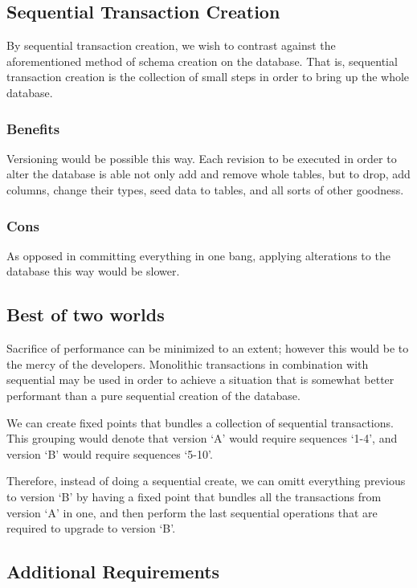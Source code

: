 \subsection{Sequential Transaction Creation}

By sequential transaction creation, we wish to contrast against the
aforementioned method of schema creation on the database. That is, sequential
transaction creation is the collection of small steps in order to bring up 
the whole database.

\subsubsection{Benefits}

Versioning would be possible this way. Each revision to be executed in order to
alter the database is able not only add and remove whole tables, but to drop,
add columns, change their types, seed data to tables, and all sorts of other
goodness.

\subsubsection{Cons}

As opposed in committing everything in one bang, applying alterations to the 
database this way would be slower.

\subsection{Best of two worlds}

Sacrifice of performance can be minimized to an extent; however this would be
to the mercy of the developers. Monolithic transactions in combination with
sequential may be used in order to achieve a situation that is somewhat better
performant than a pure sequential creation of the database. 

We can create fixed points that bundles a collection of sequential
transactions. This grouping would denote that version `A' would require
sequences `1-4', and version `B' would require sequences `5-10'. 

Therefore, instead of doing a sequential create, we can omitt everything
previous to version `B' by having a fixed point that bundles all the
transactions from version `A' in one, and then perform the last sequential
operations that are required to upgrade to version `B'.

\subsection{Additional Requirements}

